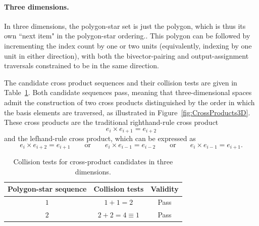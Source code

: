 \documentclass[11pt]{article}
\newcommand{\bv}[1][]{e_{#1}}
\begin{document}
\paragraph{Three dimensions.} In three dimensions, the polygon-star set is just the polygon, which is thus its own ``next item" in the polygon-star ordering.. This polygon can be followed by incrementing the index count by one or two units (equivalently, indexing by one unit in either direction), with both the bivector-pairing and output-assignment traversals constrained to be in the same direction. 

The candidate cross product sequences and their collision tests are given in Table~\ref{tab:3collisiontest}.
Both candidate sequences pass, meaning that three-dimensional spaces admit the construction of two cross products distinguished by the order in which the basis elements are traversed, as illustrated in Figure~\ref{fig:CrossProducts3D}. These cross products are the traditional righthand-rule cross product
\begin{equation}
\bv[i]\times\bv[i+1]=\bv[i+2]
\end{equation}
and the lefhand-rule cross product, which can be expressed as
\begin{equation}
\bv[i]\times\bv[i+2]=\bv[i+1] \qquad \text{or} \qquad \bv[i]\times\bv[i-1]=\bv[i-2] \qquad \text{or} \qquad \bv[i]\times\bv[i-1]=\bv[i+1].
\end{equation}


\begin{table}[tp]
\caption{Collision tests for cross-product candidates in three dimensions.}
\begin{center}
\begin{tabular}{ccc}
\toprule
Polygon-star sequence & Collision tests & Validity \\\hline
$1$ & $1+1 = 2$ & Pass \\
$2$ & $2 + 2 = 4 \equiv 1$ &  Pass
\end{tabular}
\end{center}
\label{tab:3collisiontest}
\end{table}%
\end{document}
